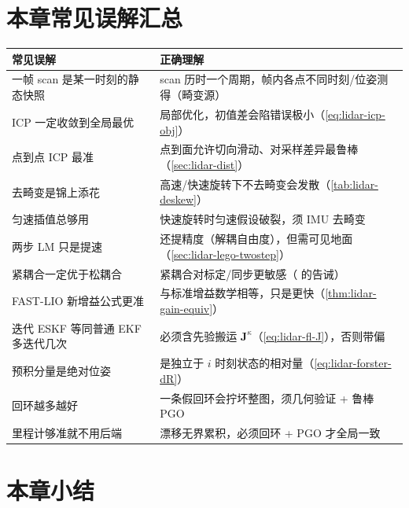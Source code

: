 \section*{本章常见误解汇总}
\begin{table}[H]\centering\small
\begin{tabular}{p{} p{}}
\toprule
\textbf{常见误解} & \textbf{正确理解} \\
\midrule
一帧 scan 是某一时刻的静态快照 & scan 历时一个周期，帧内各点不同时刻/位姿测得（畸变源）\\
ICP 一定收敛到全局最优 & 局部优化，初值差会陷错误极小（\cref{eq:lidar-icp-obj}）\\
点到点 ICP 最准 & 点到面允许切向滑动、对采样差异最鲁棒（\cref{sec:lidar-dist}）\\
去畸变是锦上添花 & 高速/快速旋转下不去畸变会发散（\cref{tab:lidar-deskew}）\\
匀速插值总够用 & 快速旋转时匀速假设破裂，须 IMU 去畸变\\
两步 LM 只是提速 & 还提精度（解耦自由度），但需可见地面（\cref{sec:lidar-lego-twostep}）\\
紧耦合一定优于松耦合 & 紧耦合对标定/同步更敏感（\cite{carlone2026handbook} 的告诫）\\
FAST-LIO 新增益公式更准 & 与标准增益数学相等，只是更快（\cref{thm:lidar-gain-equiv}）\\
迭代 ESKF 等同普通 EKF 多迭代几次 & 必须含先验搬运 $\mathbf{J}^\kappa$（\cref{eq:lidar-fl-J}），否则带偏\\
预积分量是绝对位姿 & 是独立于 $i$ 时刻状态的相对量（\cref{eq:lidar-forster-dR}）\\
回环越多越好 & 一条假回环会拧坏整图，须几何验证 + 鲁棒 PGO\\
里程计够准就不用后端 & 漂移无界累积，必须回环 + PGO 才全局一致\\
\bottomrule
\end{tabular}
\end{table}

\section*{本章小结}

